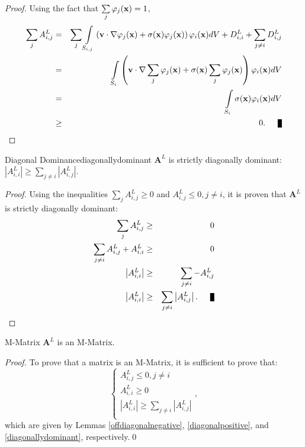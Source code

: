 \begin{proof}
Using the fact that $\sum\limits_j\varphi_j(\mathbf{x})=1$,
\begin{eqnarray*}
   \sumj A^L_{i,j} & = & \sumj\intSij
      \left(\v\cdot\nabla\varphi_j(\x) +
      \sigma(\x)\varphi_j(\x)\right)\varphi_i(\x) dV +
      D_{i,i}^L + \sum\limits_{j\neq i}D_{i,j}^L\\
   & = & \intSi\left(\v\cdot\nabla\sumj\varphi_j(\x) +
      \sigma(\x)\sumj\varphi_j(\x)\right)\varphi_i(\x) dV\\
   \label{rowsum} & = & \intSi\sigma(\x)\varphi_i(\x) dV\\
   &\ge& 0.\qed
\end{eqnarray*}
\end{proof}
\begin{lemma}{Diagonal Dominance}{diagonallydominant}
   $\mathbf{A}^L$ is strictly diagonally dominant:
   $\left|A^L_{i,i}\right| \ge \sum\limits_{j\ne i} \left|A^L_{i,j}\right|$.
\end{lemma}
\begin{proof}
Using the inequalities $\sum\limits_j A^L_{i,j} \ge 0$ and $A^L_{i,j}\le 0, j\ne i$,
it is proven that $\mathbf{A}^L$ is strictly diagonally dominant:
\begin{eqnarray*}
	\sum\limits_j A^L_{i,j} & \ge & 0\\
	\sum\limits_{j\ne i} A^L_{i,j} + A^L_{i,i} & \ge & 0\\
	\left|A^L_{i,i}\right| & \ge & \sum\limits_{j\ne i} -A^L_{i,j}\\
	\left|A^L_{i,i}\right| & \ge & \sum\limits_{j\ne i} \left|A^L_{i,j}\right|.\qed
\end{eqnarray*}
\end{proof}
\begin{lemma}{M-Matrix}{}
   $\mathbf{A}^L$ is an M-Matrix.
\end{lemma}
\begin{proof}
To prove that a matrix is an M-Matrix, it is sufficient to prove that:
\[
\left\{\begin{array}{l}
A^L_{i,j}\le 0, j\ne i\\
A^L_{i,i}\ge 0\\
\left|A^L_{i,i}\right| \ge \sum\limits_{j\ne i} \left|A^L_{i,j}\right|\\
\end{array}
\right.,
\]
which are given by Lemmas \ref{offdiagonalnegative}, \ref{diagonalpositive}, and
\ref{diagonallydominant}, respectively.\qed
\end{proof}
